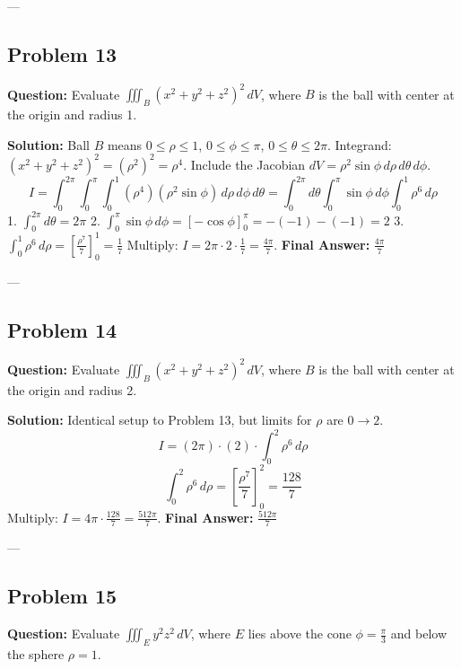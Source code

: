 \documentclass[12pt]{article}
\begin{document}
---

\subsection*{Problem 13}
\textbf{Question:} Evaluate $\iiint_B (x^2+y^2+z^2)^2 \, dV$, where $B$ is the ball with center at the origin and radius 1.

\textbf{Solution:}
Ball $B$ means $0 \le \rho \le 1$, $0 \le \phi \le \pi$, $0 \le \theta \le 2\pi$.
Integrand: $(x^2+y^2+z^2)^2 = (\rho^2)^2 = \rho^4$.
Include the Jacobian $dV = \rho^2 \sin\phi \, d\rho \, d\theta \, d\phi$.
\[ I = \int_0^{2\pi} \int_0^\pi \int_0^1 (\rho^4)(\rho^2 \sin\phi) \, d\rho \, d\phi \, d\theta = \int_0^{2\pi} d\theta \int_0^\pi \sin\phi \, d\phi \int_0^1 \rho^6 \, d\rho \]
1. $\int_0^{2\pi} d\theta = 2\pi$
2. $\int_0^\pi \sin\phi \, d\phi = [-\cos\phi]_0^\pi = -(-1) - (-1) = 2$
3. $\int_0^1 \rho^6 \, d\rho = \left[ \frac{\rho^7}{7} \right]_0^1 = \frac{1}{7}$
Multiply: $I = 2\pi \cdot 2 \cdot \frac{1}{7} = \frac{4\pi}{7}$.
\textbf{Final Answer:} $\frac{4\pi}{7}$

---

\subsection*{Problem 14}
\textbf{Question:} Evaluate $\iiint_B (x^2+y^2+z^2)^2 \, dV$, where $B$ is the ball with center at the origin and radius 2.

\textbf{Solution:}
Identical setup to Problem 13, but limits for $\rho$ are $0 \to 2$.
\[ I = (2\pi) \cdot (2) \cdot \int_0^2 \rho^6 \, d\rho \]
\[ \int_0^2 \rho^6 \, d\rho = \left[ \frac{\rho^7}{7} \right]_0^2 = \frac{128}{7} \]
Multiply: $I = 4\pi \cdot \frac{128}{7} = \frac{512\pi}{7}$.
\textbf{Final Answer:} $\frac{512\pi}{7}$

---

\subsection*{Problem 15}
\textbf{Question:} Evaluate $\iiint_E y^2 z^2 \, dV$, where $E$ lies above the cone $\phi = \frac{\pi}{3}$ and below the sphere $\rho=1$.
\end{document}
